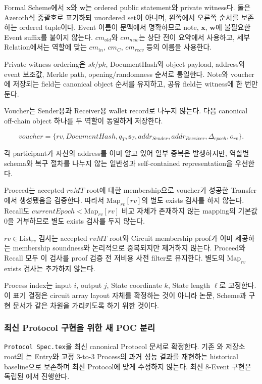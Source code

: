 \documentclass[11pt]{extarticle}
\newcommand{\List}[1]{\mathrm{List}_{#1}}
\newcommand{\Map}[1]{\mathrm{Map}_{#1}}
\begin{document}
Formal Scheme에서 $\mathbf{x}$와 $\mathbf{w}$는 ordered public statement와 private
witness다. 둘은 Azeroth식 중괄호로 표기하되 unordered set이 아니며, 왼쪽에서 오른쪽
순서를 보존하는 ordered tuple이다. Event 이름이 문맥에서 명확하므로 note, $\mathbf{x}$,
$\mathbf{w}$에 불필요한
Event suffix를 붙이지 않는다. $cm_{old}$와 $cm_{new}$는 상단 전이 요약에서 사용하고,
세부 Relation에서는 역할에 맞는 $cm_{in}$, $cm_C$, $cm_{recv}$ 등의 이름을 사용한다.

Private witness ordering은 $sk/pk$, DocumentHash와 object payload, address와 event 보조값,
Merkle path, opening/randomness 순서로 통일한다. Note와 voucher에 저장되는 field는 canonical
object 순서를 유지하고, 공유 field는 witness에 한 번만 둔다.

Voucher는 Sender용과 Receiver용 wallet record로 나누지 않는다. 다음 canonical
off-chain object 하나를 두 역할이 동일하게 저장한다.

\[
\mathit{voucher}=\{
rv,\mathit{DocumentHash},q_T,\mathbf{s}_T,
addr_{Sender},addr_{Receiver},\Delta_{epoch},o_{rv}
\}.
\]

각 participant가 자신의 address를 이미 알고 있어 일부 중복은 발생하지만, 역할별 schema와
복구 절차를 나누지 않는 일반성과 self-contained representation을 우선한다.

Proceed는 accepted $rvMT$ root에 대한 membership으로 voucher가 성공한 Transfer에서
생성됐음을 검증한다. 따라서 $\Map{rv}[rv]$의 별도 exists 검사를 하지 않는다. Recall도
$currentEpoch<\Map{rv}[rv]$ 비교 자체가 존재하지 않는 mapping의 기본값 0을 거부하므로
별도 exists 검사를 두지 않는다.

$rv\in\List{rv}$ 검사는 accepted $rvMT$ root와 Circuit membership proof가 이미 제공하는
membership soundness와 논리적으로 중복되지만 제거하지 않는다. Proceed와 Recall 모두
이 검사를 proof 검증 전 저비용 사전 filter로 유지한다. 별도의 $\Map{rv}$ exists 검사는
추가하지 않는다.

Process index는 input $i$, output $j$, State coordinate $k$, State length $\ell$로 고정한다.
이 표기 결정은 circuit array layout 자체를 확정하는 것이 아니라 논문, Scheme과 구현
문서가 같은 차원을 가리키도록 하기 위한 것이다.

\subsubsection{최신 Protocol 구현을 위한 새 POC 분리}

\texttt{Protocol Spec.tex}을 최신 canonical Protocol 문서로 확정한다.
기존 와 저장소 root의 는 Entry와 고정 3-to-3 Process의
과거 성능 결과를 재현하는 historical baseline으로 보존하며 최신 Protocol에 맞게
수정하지 않는다. 최신 8-Event 구현은 독립된 에서 진행한다.
\end{document}
